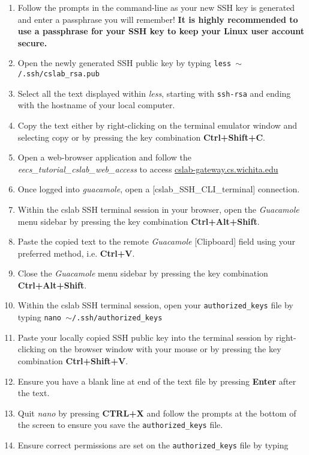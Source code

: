 \documentclass[12pt]{article}
\begin{document}
\begin{flushleft}
\begin{enumerate}
  \item Follow the prompts in the command-line as your new SSH key is generated and enter a passphrase you will remember! \break
  \textbf{It is highly recommended to use a passphrase for your SSH key to keep your Linux user account secure.}
  
  \item Open the newly generated SSH public key by typing \break
  \texttt{less $\sim$/.ssh/cslab\_rsa.pub}
  \item Select all the text displayed within \textit{less}, starting with \texttt{ssh-rsa} and ending with the hostname of your local computer.
  \item Copy the text either by right-clicking on the terminal emulator window and selecting copy or by pressing the key combination \textbf{Ctrl+Shift+C}.
  \item Open a web-browser application and follow the \textit{eecs\_tutorial\_cslab\_web\_access} to access \href{https://cslab-gateway.cs.wichita.edu/}{cslab-gateway.cs.wichita.edu}
  \item Once logged into \textit{guacamole}, open a [cslab\_SSH\_CLI\_terminal] connection.
  \item Within the cslab SSH terminal session in your browser, open the \textit{Guacamole} menu sidebar by pressing the key combination \textbf{Ctrl+Alt+Shift}.
  \item Paste the copied text to the remote \textit{Guacamole} [Clipboard] field using your preferred method, i.e. \textbf{Ctrl+V}.
  \item Close the \textit{Guacamole} menu sidebar by pressing the key combination \textbf{Ctrl+Alt+Shift}.
  \item Within the cslab SSH terminal session, open your \texttt{authorized\_keys} file by typing \break
  \texttt{nano $\sim$/.ssh/authorized\_keys}
  \item Paste your locally copied SSH public key into the terminal session by right-clicking on the browser window with your mouse or by pressing the key combination \textbf{Ctrl+Shift+V}.
  \item Ensure you have a blank line at end of the text file by pressing \textbf{Enter} after the text.
  \item Quit \textit{nano} by pressing \textbf{CTRL+X} and follow the prompts at the bottom of the screen to ensure you save the \texttt{authorized\_keys} file.
  \item Ensure correct permissions are set on the \texttt{authorized\_keys} file by typing \break

\end{enumerate}
\end{flushleft}
\end{document}
